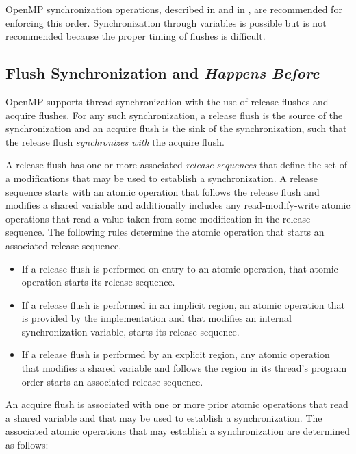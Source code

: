 \begin{note}
OpenMP synchronization operations, described in 
 and in 
, are recommended for enforcing this 
order. Synchronization through variables is possible but is not 
recommended because the proper timing of flushes is difficult.
\end{note}


\subsection{Flush Synchronization and \emph{Happens Before}}
\label{subsec:happens-before}

OpenMP supports thread synchronization with the use of release flushes and
acquire flushes. For any such synchronization, a release flush is the source
of the synchronization and an acquire flush is the sink of the
synchronization, such that the release flush \emph{synchronizes with} the
acquire flush.

A release flush has one or more associated \emph{release sequences} that
define the set of a modifications that may be used to establish a
synchronization. A release sequence starts with an atomic operation
that follows the release flush and modifies a shared variable and additionally
includes any read-modify-write atomic operations that read a value taken from
some modification in the release sequence. The following rules determine the 
atomic operation that starts an associated release sequence.

\begin{itemize}
\item If a release flush is performed on entry to an atomic operation, that
    atomic operation starts its release sequence.
\item If a release flush is performed in an implicit  region, an 
    atomic operation that is provided by the implementation and that modifies
    an internal synchronization variable, starts its release sequence.
\item If a release flush is performed by an explicit  region, any
    atomic operation that modifies a shared variable and follows the
     region in its thread's program order starts an associated
    release sequence.
\end{itemize}

An acquire flush is associated with one or more prior atomic operations that
read a shared variable and that may be used to establish a synchronization.
The associated atomic operations that may establish a synchronization are
determined as follows:

